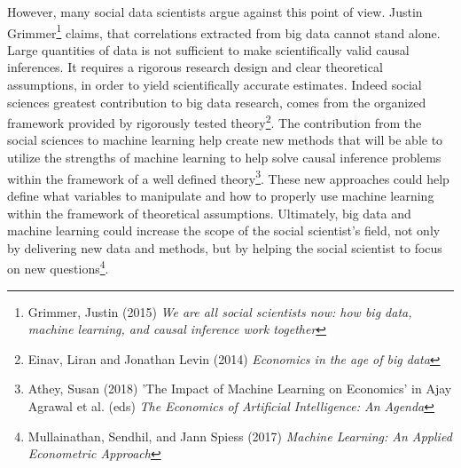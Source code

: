 \documentclass[12pt,a4paper]{article}
\begin{document}
However, many social data scientists argue against this point of view. Justin Grimmer\footnote{Grimmer, Justin (2015) \textit{We are all social scientists now: how big data, machine learning, and causal inference work together}} claims, that correlations extracted from big data cannot stand alone. Large quantities of data is not sufficient to make scientifically valid causal inferences. It requires a rigorous research design and clear theoretical assumptions, in order to yield scientifically accurate estimates. Indeed social sciences greatest contribution to big data research, comes from the organized framework provided by rigorously tested theory\footnote{Einav, Liran and Jonathan Levin (2014) \textit{Economics in the age of big data}}.\newline
The contribution from the social sciences to machine learning help create new methods that will be able to utilize the strengths of machine learning to help solve causal inference problems within the framework of a well defined theory\footnote{Athey, Susan (2018) 'The Impact of Machine Learning on Economics' in Ajay Agrawal et al. (eds) \textit{The Economics of Artificial Intelligence: An Agenda}}. These new approaches could help define what variables to manipulate and how to properly use machine learning within the framework of theoretical assumptions. Ultimately, big data and machine learning could increase the scope of the social scientist's field, not only by delivering new data and methods, but by helping the social scientist to focus on new questions\footnote{Mullainathan, Sendhil, and Jann Spiess (2017) \textit{Machine Learning: An Applied Econometric Approach}}.
\end{document}
